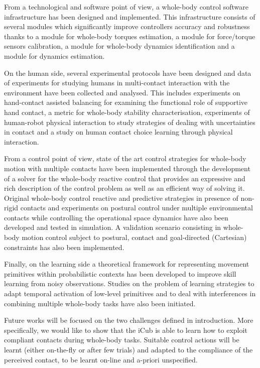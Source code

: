 \documentclass[final,5p,twocolumn]{elsarticle}
\begin{document}
From a technological and software point of view, a whole-body control software infrastructure has been designed and implemented. This infrastructure consists of several modules which significantly improve controllers accuracy and robustness thanks to a module for whole-body torques estimation, a module for force/torque sensors calibration, a module for whole-body dynamics identification and a module for dynamics estimation.

On the human side, several experimental protocols have been designed and data of experiments for studying humans in multi-contact interaction with the environment have been collected and analysed. This includes experiments on hand-contact assisted balancing for examining the functional role of supportive hand contact, a metric for whole-body stability characterisation, experiments of human-robot physical interaction to study strategies of dealing with uncertainties in contact and a study on human contact choice learning through physical interaction.

From a control point of view, state of the art control strategies for whole-body motion with multiple contacts have been implemented through the development of a solver for the whole-body reactive control that provides an expressive and rich description of the control problem as well as an efficient way of solving it. Original  whole-body control reactive and predictive strategies in presence of non-rigid contacts and experiments on postural control under multiple environmental contacts while controlling the operational space dynamics have also been developed and tested in simulation. A validation scenario consisting in whole-body motion control subject to postural, contact and goal-directed (Cartesian) constraints has also been implemented.

Finally, on the learning side a theoretical framework for representing movement primitives within probabilistic contexts has been developed to improve skill learning from noisy observations. Studies on the problem of learning strategies to adapt temporal activation of low-level primitives and to deal with interferences in combining multiple whole-body tasks have also been initiated.

Future works will be focused on the two challenges defined in introduction. More specifically, we would like to show that the iCub is able to learn how to exploit compliant contacts during whole-body tasks. Suitable control actions will be learnt (either on-the-fly or after few trials) and adapted to the compliance of the perceived contact, to be learnt on-line and a-priori unspecified. 
\end{document}
